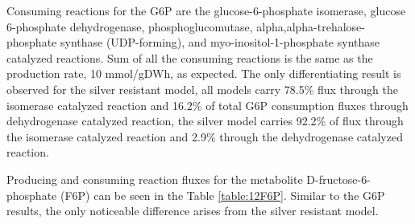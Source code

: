 Consuming reactions for the G6P are the glucose-6-phosphate isomerase, glucose 6-phosphate dehydrogenase, phosphoglucomutase, alpha,alpha-trehalose-phosphate synthase (UDP-forming), and myo-inositol-1-phosphate synthase catalyzed reactions. Sum of all the consuming reactions is the same as the production rate, 10 mmol/gDWh, as expected. The only differentiating result is observed for the silver resistant model, all models carry 78.5\% flux through the isomerase catalyzed reaction and 16.2\% of total G6P consumption fluxes through dehydrogenase catalyzed reaction, the silver model carries 92.2\% of flux through the isomerase catalyzed reaction and 2.9\% through the dehydrogenase catalyzed reaction.

Producing and consuming reaction fluxes for the metabolite D-fructose-6-phosphate (F6P) can be seen in the Table \ref{table:12F6P}. Similar to the G6P results, the only noticeable difference arises from the silver resistant model.

